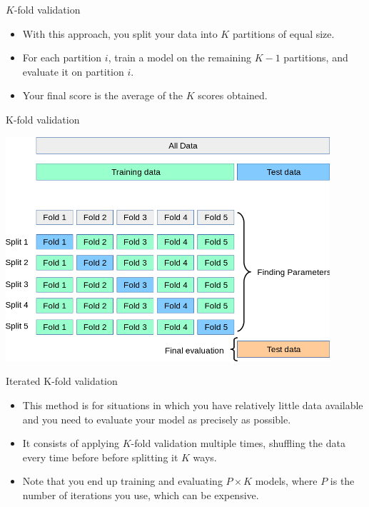 \documentclass{beamer}
\begin{document}

\begin{frame}{$K$-fold validation}
\begin{itemize}
\item With this approach, you split your data into $K$ partitions of equal size.

\medskip
\item For each partition $i$, train a model on the remaining $K-1$ partitions, and evaluate it on partition $i$.

\medskip
\item Your final score is the average of the $K$ scores obtained.
\end{itemize}
\end{frame}


\begin{frame}{K-fold validation}

\includegraphics[width=0.9\textwidth]{images/grid_search_cross_validation.png}
\end{frame}


\begin{frame}{Iterated K-fold validation}
\begin{itemize}
\item This method is for situations in which you have relatively little data available and you need to evaluate your model as precisely as possible.

\medskip
\item It consists of applying $K$-fold validation multiple times, shuffling the data every time before before splitting it $K$ ways.

\medskip
\item Note that you end up training and evaluating $P\times K$ models, where $P$ is the number of iterations you use, which can be expensive.
\end{itemize}
\end{frame}
\end{document}
